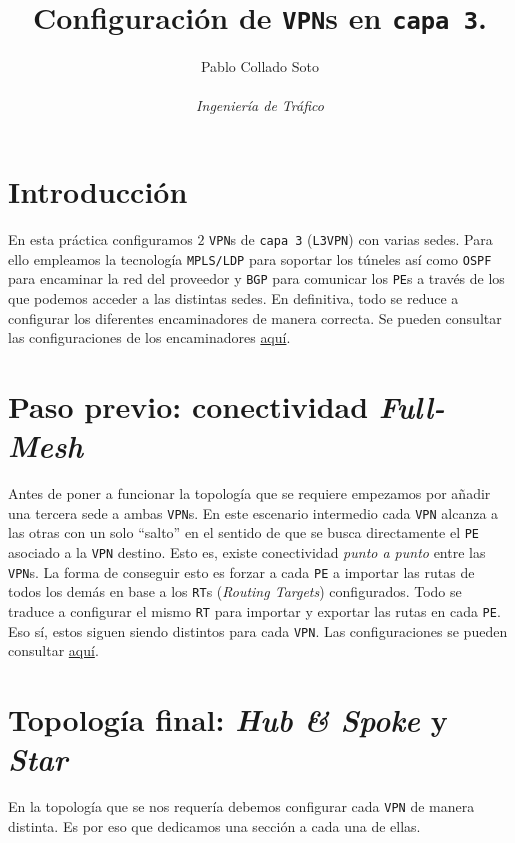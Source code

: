 \documentclass[11pt]{article}
\title{Configuración de \texttt{VPN}s en \texttt{capa 3}.}
\author{Pablo Collado Soto \\ \\ \textit{Ingeniería de Tráfico}}
\date{}
\begin{document}
    \maketitle

    \section{Introducción}
        En esta práctica configuramos $2$ \texttt{VPN}s de \texttt{capa 3} (\texttt{L3VPN}) con varias sedes. Para ello empleamos la tecnología \texttt{MPLS/LDP} para soportar los túneles así como \texttt{OSPF} para encaminar la red del proveedor y \texttt{BGP} para comunicar los \texttt{PE}s a través de los que podemos acceder a las distintas sedes. En definitiva, todo se reduce a configurar los diferentes encaminadores de manera correcta. Se pueden consultar las configuraciones de los encaminadores \href{https://github.com/UAH-s-Telematics-Engineering-Tasks/traff_eng/tree/master/P5/Router_confs}{aquí}.

    \section{Paso previo: conectividad \textit{Full-Mesh}}
        Antes de poner a funcionar la topología que se requiere empezamos por añadir una tercera sede a ambas \texttt{VPN}s. En este escenario intermedio cada \texttt{VPN} alcanza a las otras con un solo ``salto'' en el sentido de que se busca directamente el \texttt{PE} asociado a la \texttt{VPN} destino. Esto es, existe conectividad \textit{punto a punto} entre las \texttt{VPN}s. La forma de conseguir esto es forzar a cada \texttt{PE} a importar las rutas de todos los demás en base a los \texttt{RT}s (\textit{Routing Targets}) configurados. Todo se traduce a configurar el mismo \texttt{RT} para importar y exportar las rutas en cada \texttt{PE}. Eso sí, estos siguen siendo distintos para cada \texttt{VPN}. Las configuraciones se pueden consultar \href{https://github.com/UAH-s-Telematics-Engineering-Tasks/traff_eng/tree/master/P5/Router_confs/Full_mesh}{aquí}.

    \section{Topología final: \textit{Hub \& Spoke} y \textit{Star}}
        En la topología que se nos requería debemos configurar cada \texttt{VPN} de manera distinta. Es por eso que dedicamos una sección a cada una de ellas.
\end{document}
